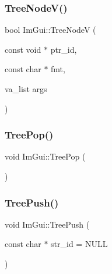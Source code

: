 \hypertarget{namespace_im_gui_a15320f61ba6b4916af3323bf7844602e}{}\label{namespace_im_gui_a15320f61ba6b4916af3323bf7844602e} 
\subsubsection{\texorpdfstring{Tree\+Node\+V()}{TreeNodeV()}\hspace{0.1cm}{\footnotesize\ttfamily [2/2]}}
{\footnotesize\ttfamily bool Im\+Gui\+::\+Tree\+NodeV (\begin{DoxyParamCaption}\item[{const void $\ast$}]{ptr\+\_\+id,  }\item[{const char $\ast$}]{fmt,  }\item[{va\+\_\+list}]{args }\end{DoxyParamCaption})}

\hypertarget{namespace_im_gui_a41ecf265e5f678c78fc9c30b3cf2077f}{}\label{namespace_im_gui_a41ecf265e5f678c78fc9c30b3cf2077f} 
\subsubsection{\texorpdfstring{Tree\+Pop()}{TreePop()}}
{\footnotesize\ttfamily void Im\+Gui\+::\+Tree\+Pop (\begin{DoxyParamCaption}{ }\end{DoxyParamCaption})}

\hypertarget{namespace_im_gui_a596151d99bca5cc0b6393809c1e07af5}{}\label{namespace_im_gui_a596151d99bca5cc0b6393809c1e07af5} 
\subsubsection{\texorpdfstring{Tree\+Push()}{TreePush()}\hspace{0.1cm}{\footnotesize\ttfamily [1/2]}}
{\footnotesize\ttfamily void Im\+Gui\+::\+Tree\+Push (\begin{DoxyParamCaption}\item[{const char $\ast$}]{str\+\_\+id = {\ttfamily NULL} }\end{DoxyParamCaption})}

\hypertarget{namespace_im_gui_a71440d86edee2b23abc25cb80e9c9444}{}\label{namespace_im_gui_a71440d86edee2b23abc25cb80e9c9444} 

